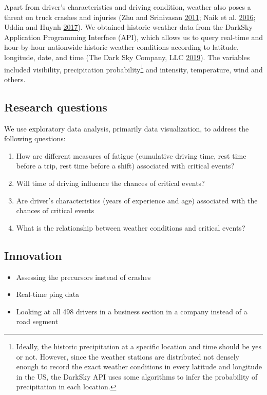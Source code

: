 \documentclass[]{elsarticle} %
\providecommand{\tightlist}{%
  \setlength{\itemsep}{0pt}\setlength{\parskip}{0pt}}
\begin{document}
Apart from driver's characteristics and driving condition, weather also poses a threat on truck crashes and injuries (Zhu and Srinivasan \protect\hyperlink{ref-zhu2011comprehensive}{2011}; Naik et al. \protect\hyperlink{ref-naik2016weather}{2016}; Uddin and Huynh \protect\hyperlink{ref-uddin2017truck}{2017}). We obtained historic weather data from the DarkSky Application Programming Interface (API), which allows us to query real-time and hour-by-hour nationwide historic weather conditions according to latitude, longitude, date, and time (The Dark Sky Company, LLC \protect\hyperlink{ref-darksky}{2019}). The variables included visibility, precipitation probability\footnote{Ideally, the historic precipitation at a specific location and time should be yes or not. However, since the weather stations are distributed not densely enough to record the exact weather conditions in every latitude and longitude in the US, the DarkSky API uses some algorithms to infer the probability of precipitation in each location.} and intensity, temperature, wind and others.

\hypertarget{research-questions}{%
\subsection{Research questions}\label{research-questions}}

We use exploratory data analysis, primarily data visualization, to address the following questions:

\begin{enumerate}
\def\labelenumi{\arabic{enumi}.}
\tightlist
\item
  How are different measures of fatigue (cumulative driving time, rest time before a trip, rest time before a shift) associated with critical events?
\item
  Will time of driving influence the chances of critical events?
\item
  Are driver's characteristics (years of experience and age) associated with the chances of critical events
\item
  What is the relationship between weather conditions and critical events?
\end{enumerate}

\hypertarget{innovation}{%
\subsection{Innovation}\label{innovation}}

\begin{itemize}
\tightlist
\item
  Assessing the precursors instead of crashes
\item
  Real-time ping data
\item
  Looking at all 498 drivers in a business section in a company instead of a road segment
\end{itemize}
\end{document}
